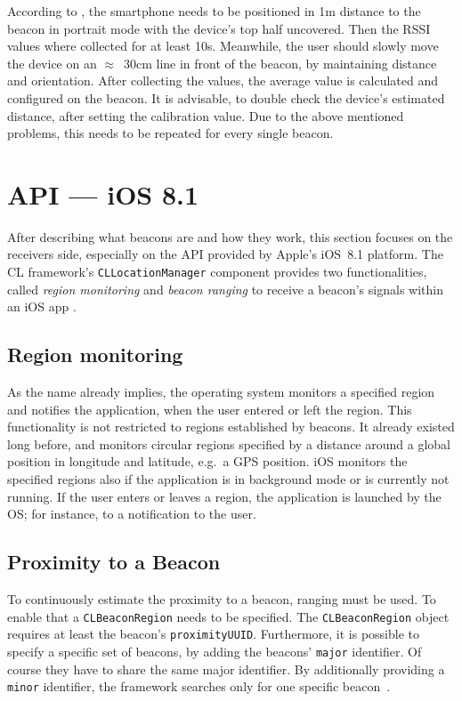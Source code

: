 According to \citet{apple:getting_started}, the smartphone needs to be positioned in 1m distance to the beacon in portrait mode with the device's top half uncovered. Then the \ac{RSSI} values where collected for at least 10s. Meanwhile, the user should slowly move the device on an $\approx$~30cm line in front of the beacon, by maintaining distance and orientation. After collecting the values, the average value is calculated and configured on the beacon. It is advisable, to double check the device's estimated distance, after setting the calibration value. Due to the above mentioned problems, this needs to be repeated for every single beacon.

\section{API --- iOS 8.1}
After describing what beacons are and how they work, this section focuses on the receivers side, especially on the \acs{API} provided by Apple's iOS~8.1 platform. The \acf{CL} framework's \texttt{CLLocationManager} component provides two functionalities, called \emph{region monitoring} and \emph{beacon ranging} to receive a beacon's signals within an iOS app \citep{apple:ios_doc_cl}.

\subsection*{Region monitoring}
As the name already implies, the operating system monitors a specified region and notifies the application, when the user entered or left the region. This functionality is not restricted to regions established by beacons. It already existed long before, and monitors circular regions specified by a distance around a global position in longitude and latitude, e.g.\ a \acs{GPS} position.
iOS monitors the specified regions also if the application is in background mode or is currently not running. If the user enters or leaves a region, the application is launched by the \ac{OS}; for instance, to a notification to the user\citep{apple:wwdc_2012_bruins,apple:wwdc_2013_bruins,apple:ios_doc_cl}.

\subsection*{Proximity to a Beacon}
To continuously estimate the proximity to a beacon, ranging must be used. To enable that a \texttt{CLBeaconRegion} needs to be specified. The \texttt{CLBeaconRegion} object requires at least the beacon's \texttt{proximityUUID}. Furthermore, it is possible to specify a specific set of beacons, by adding the beacons' \texttt{major} identifier. Of course they have to share the same major identifier. By additionally providing a \texttt{minor} identifier, the framework searches only for one specific beacon~\citep{apple:wwdc_2013_bruins,apple:ios_doc_cl}.

